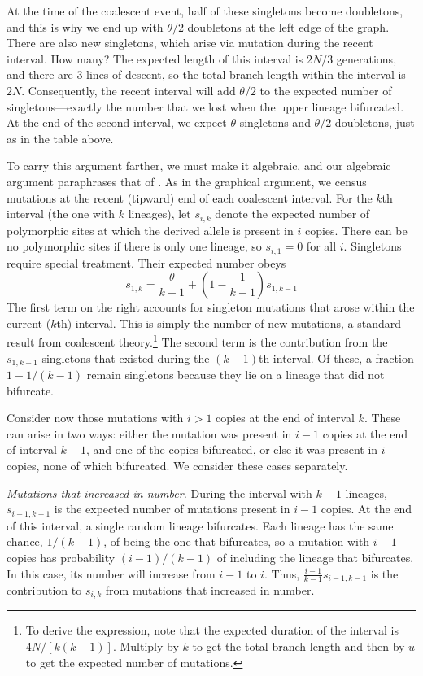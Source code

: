 \documentclass[12pt,twocolumn]{article}
\begin{document}
At the time of the coalescent event, half of these singletons become
doubletons, and this is why we end up with $\theta/2$ doubletons at
the left edge of the graph. There are also new singletons, which arise
via mutation during the recent interval. How many? The expected length
of this interval is $2N/3$ generations, and there are 3 lines of
descent, so the total branch length within the interval is
$2N$. Consequently, the recent interval will add $\theta/2$ to the
expected number of singletons---exactly the number that we lost when
the upper lineage bifurcated. At the end of the second interval, we
expect $\theta$ singletons and $\theta/2$ doubletons, just as in the
table above.

To carry this argument farther, we must make it algebraic, and our
algebraic argument paraphrases that of
\citet{Hudson:PLO-10-e0118087}. As in the graphical argument, we
census mutations at the recent (tipward) end of each coalescent
interval.  For the $k$th interval (the one with $k$ lineages), let
$s_{i,k}$ denote the expected number of polymorphic sites at which the
derived allele is present in $i$ copies. There can be no polymorphic
sites if there is only one lineage, so $s_{i,1}=0$ for all $i$.
Singletons require special treatment.  Their expected number obeys
\begin{equation}
s_{1,k} = \frac{\theta}{k-1} + \left(1 - \frac{1}{k-1}\right)s_{1,k-1}
\label{eq.s1}
\end{equation}
The first term on the right accounts for singleton mutations that
arose within the current ($k$th) interval.  This is simply the number
of new mutations, a standard result from coalescent
theory.\footnote{To derive the expression, note that the expected
  duration of the interval is $4N/[k(k-1)]$.  Multiply by $k$ to get
  the total branch length and then by $u$ to get the expected number
  of mutations.}  The second term is the contribution from the
$s_{1,k-1}$ singletons that existed during the $(k-1)$th interval.  Of
these, a fraction $1-1/(k-1)$ remain singletons because they lie on a
lineage that did not bifurcate.

Consider now those mutations with $i>1$ copies at the end of interval
$k$. These can arise in two ways: either the mutation was present in
$i-1$ copies at the end of interval $k-1$, and one of the copies
bifurcated, or else it was present in $i$ copies, none of which
bifurcated. We consider these cases separately.

\emph{Mutations that increased in number.} During the interval with
$k-1$ lineages, $s_{i-1,k-1}$ is the expected number of mutations
present in $i-1$ copies. At the end of this interval, a single random
lineage bifurcates. Each lineage has the same chance, $1/(k-1)$, of
being the one that bifurcates, so a mutation with $i-1$ copies has
probability $(i-1)/(k-1)$ of including the lineage that bifurcates. In
this case, its number will increase from $i-1$ to $i$. Thus,
$\frac{i-1}{k-1}s_{i-1,k-1}$ is the contribution to $s_{i,k}$ from
mutations that increased in number.
\end{document}

